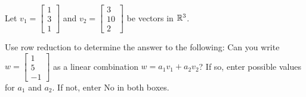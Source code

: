 



\endedxvertical









Let $v_1 = \left[\begin{array}{c} 1 \\ 3  \\ 1 \end{array} \right]$ and  
$v_2 = \left[\begin{array}{c} 3 \\ 10  \\ 2 \end{array} \right]$  be vectors in $\mathbb R^3$.

Use row reduction to determine the answer to the following: 
Can you write $w = \left[\begin{array}{c} 1 \\ 5 \\ -1 \end{array} \right]$
as a linear combination $w = a_1 v_1 + a_2 v_2$?  If so, enter possible values for $a_1$ and
$a_2$.  If not, enter No in both boxes.  


\\
\\


